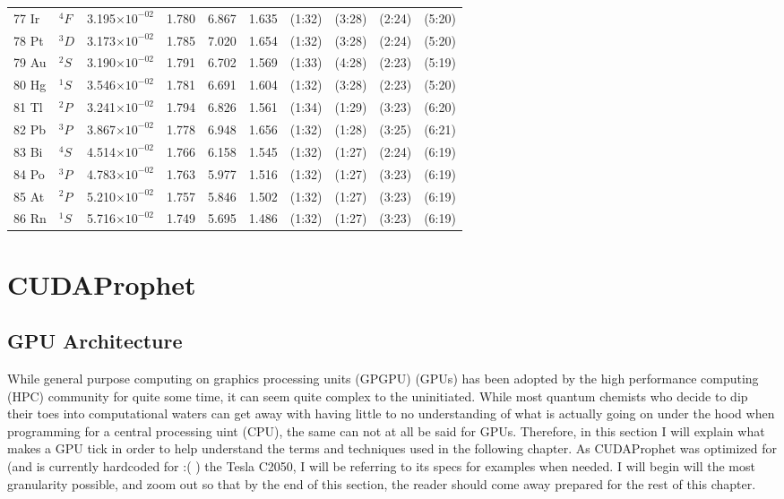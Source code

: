 \documentclass[12pt]{book}
\begin{document}
\begin{center}
\begin{longtable}{l l l l l l l l l l}
77 Ir & $^{4}F$ & 3.195$\times10^{-02}$ & 1.780 & 6.867 & 1.635 & (1:32) & (3:28) & (2:24) & (5:20) \\
78 Pt & $^{3}D$ & 3.173$\times10^{-02}$ & 1.785 & 7.020 & 1.654 & (1:32) & (3:28) & (2:24) & (5:20) \\
79 Au & $^{2}S$ & 3.190$\times10^{-02}$ & 1.791 & 6.702 & 1.569 & (1:33) & (4:28) & (2:23) & (5:19) \\
80 Hg & $^{1}S$ & 3.546$\times10^{-02}$ & 1.781 & 6.691 & 1.604 & (1:32) & (3:28) & (2:23) & (5:20) \\
81 Tl & $^{2}P$ & 3.241$\times10^{-02}$ & 1.794 & 6.826 & 1.561 & (1:34) & (1:29) & (3:23) & (6:20) \\
82 Pb & $^{3}P$ & 3.867$\times10^{-02}$ & 1.778 & 6.948 & 1.656 & (1:32) & (1:28) & (3:25) & (6:21) \\
83 Bi & $^{4}S$ & 4.514$\times10^{-02}$ & 1.766 & 6.158 & 1.545 & (1:32) & (1:27) & (2:24) & (6:19) \\
84 Po & $^{3}P$ & 4.783$\times10^{-02}$ & 1.763 & 5.977 & 1.516 & (1:32) & (1:27) & (3:23) & (6:19) \\
85 At & $^{2}P$ & 5.210$\times10^{-02}$ & 1.757 & 5.846 & 1.502 & (1:32) & (1:27) & (3:23) & (6:19) \\
86 Rn & $^{1}S$ & 5.716$\times10^{-02}$ & 1.749 & 5.695 & 1.486 & (1:32) & (1:27) & (3:23) & (6:19) \\
\hline
	
\end{longtable}
\end{center}
	
\chapter{CUDAProphet}
\section{GPU Architecture}
While general purpose computing on graphics processing units (GPGPU) (GPUs) has been adopted by the high performance computing (HPC) community for quite some time, it can seem quite complex to the uninitiated. While most quantum chemists who decide to dip their toes into computational waters can get away with having little to no understanding of what is actually going on under the hood when programming for a central processing uint (CPU), the same can not at all be said for GPUs. Therefore, in this section I will explain what makes a GPU tick in order to help understand the terms and techniques used in the following chapter. As CUDAProphet was optimized for (and is currently hardcoded for :( ) the Tesla C2050, I will be referring to its specs for examples when needed. I will begin will the most granularity possible, and zoom out so that by the end of this section, the reader should come away prepared for the rest of this chapter.
\end{document}
